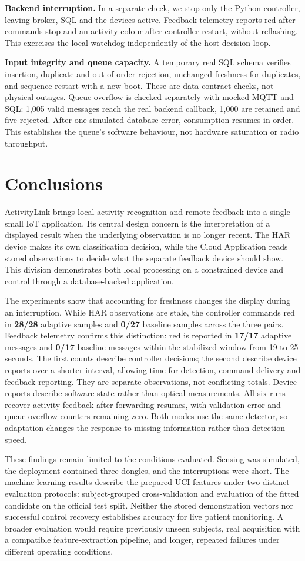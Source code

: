 \documentclass[11pt,a4paper]{article}
\newcommand{\reportsection}[1]{\section{#1}}
\begin{document}
\textbf{Backend interruption.} In a separate check, we stop only the Python controller, leaving broker, SQL and the devices active. Feedback telemetry reports red after commands stop and an activity colour after controller restart, without reflashing. This exercises the local watchdog independently of the host decision loop.

\textbf{Input integrity and queue capacity.} A temporary real SQL schema verifies insertion, duplicate and out-of-order rejection, unchanged freshness for duplicates, and sequence restart with a new boot. These are data-contract checks, not physical outages. Queue overflow is checked separately with mocked MQTT and SQL: 1,005 valid messages reach the real backend callback, 1,000 are retained and five rejected. After one simulated database error, consumption resumes in order. This establishes the queue's software behaviour, not hardware saturation or radio throughput.
\clearpage
\reportsection{Conclusions}
ActivityLink brings local activity recognition and remote feedback into a single small IoT application. Its central design concern is the interpretation of a displayed result when the underlying observation is no longer recent. The HAR device makes its own classification decision, while the Cloud Application reads stored observations to decide what the separate feedback device should show. This division demonstrates both local processing on a constrained device and control through a database-backed application.

The experiments show that accounting for freshness changes the display during an interruption. While HAR observations are stale, the controller commands red in \textbf{28/28} adaptive samples and \textbf{0/27} baseline samples across the three pairs. Feedback telemetry confirms this distinction: red is reported in \textbf{17/17} adaptive messages and \textbf{0/17} baseline messages within the stabilized window from 19 to 25 seconds. The first counts describe controller decisions; the second describe device reports over a shorter interval, allowing time for detection, command delivery and feedback reporting. They are separate observations, not conflicting totals. Device reports describe software state rather than optical measurements. All six runs recover activity feedback after forwarding resumes, with validation-error and queue-overflow counters remaining zero. Both modes use the same detector, so adaptation changes the response to missing information rather than detection speed.

These findings remain limited to the conditions evaluated. Sensing was simulated, the deployment contained three dongles, and the interruptions were short. The machine-learning results describe the prepared UCI features under two distinct evaluation protocols: subject-grouped cross-validation and evaluation of the fitted candidate on the official test split. Neither the stored demonstration vectors nor successful control recovery establishes accuracy for live patient monitoring. A broader evaluation would require previously unseen subjects, real acquisition with a compatible feature-extraction pipeline, and longer, repeated failures under different operating conditions.
\end{document}
